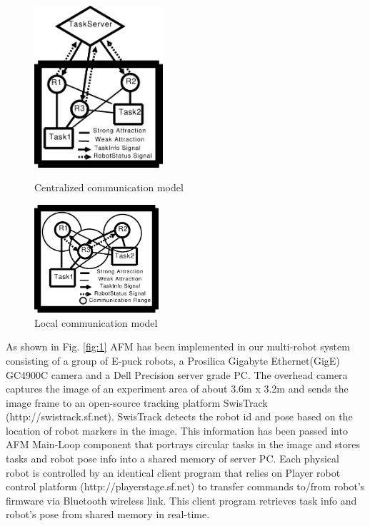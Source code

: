 \documentclass{llncs}
\begin{document}
\begin{figure}[ht]
\begin{minipage}[b]{0.55\linewidth}
\centering
\includegraphics[height=6cm, angle=0]{../dia-files/CentralizedComm.eps}
\caption{Centralized communication model}
\label{fig:1} %
\end{minipage}
\begin{minipage}[b]{0.45\linewidth}
\centering
\includegraphics[height=4cm, angle=0]{../dia-files/LocalComm.eps}
\caption{Local communication model}
\label{fig:2} %
\end{minipage}
\end{figure}
As shown in Fig. \ref{fig:1} AFM has been implemented in our multi-robot system consisting of a group of E-puck robots, a Prosilica Gigabyte Ethernet(GigE) GC4900C camera and a Dell Precision server grade PC. The overhead camera captures the image of an experiment area of about 3.6m x 3.2m and sends the image frame to an open-source tracking platform SwisTrack (http://swistrack.sf.net). SwisTrack detects the robot id and pose based on the location of robot markers in the image. This information has been passed into AFM Main-Loop component that portrays circular tasks in the image and stores tasks and robot pose info into a shared memory of server PC. Each physical robot is controlled by an identical client program that relies on Player robot control platform (http://playerstage.sf.net) to transfer commands to/from robot's firmware via Bluetooth wireless link. This client program retrieves task info and robot's pose from shared memory in real-time.
% 
\end{document}
